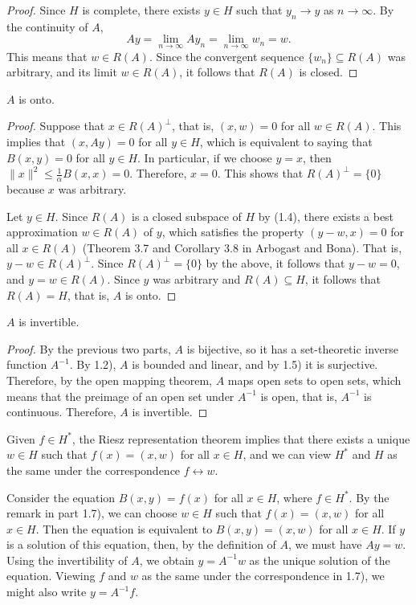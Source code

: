 \documentclass{homework}
\begin{document}
\begin{arabicparts}
\begin{proof}
			Since $H$ is complete, there exists $y \in H$ such that $y_n \to y$ as $n \to \infty$. By the continuity of $A$,
			\begin{equation}
				Ay = \lim_{n\to \infty}Ay_n = \lim_{n\to\infty} w_n = w.
			\end{equation}
			This means that $w \in R(A)$. Since the convergent sequence $\{w_n\}\subseteq R(A)$ was arbitrary, and its limit $w \in R(A)$, it follows that $R(A)$ is closed.
		\end{proof}
		
		\questionpart
		$A$ is onto.
		\begin{proof}
			Suppose that $x \in R(A)^\perp$, that is, $(x, w) = 0$ for all $w \in R(A)$. This implies that $(x, Ay) = 0$ for all $y \in H$, which is equivalent to saying that $B(x, y) = 0$ for all $y \in H$. In particular, if we choose $y = x$, then $\lVert x\rVert^2 \le \frac{1}{\alpha}B(x, x) = 0$. Therefore, $x = 0$. This shows that $R(A)^\perp = \{0\}$ because $x$ was arbitrary. 
			
			Let $y \in H$. Since $R(A)$ is a closed subspace of $H$ by (1.4), there exists a best approximation $w \in R(A)$ of $y$, which satisfies the property $(y - w, x) = 0$ for all $x \in R(A)$ (Theorem 3.7 and Corollary 3.8 in Arbogast and Bona). That is, $y-w \in R(A)^\perp$. Since $R(A)^\perp =\{0\}$ by the above, it follows that $y-w = 0$, and $y=w \in R(A)$. Since $y$ was arbitrary and $R(A) \subseteq H$, it follows that $R(A) = H$, that is, $A$  is onto.
		\end{proof}
		
		\questionpart
		$A$ is invertible.
		\begin{proof}
			By the previous two parts, $A$ is bijective, so it has a set-theoretic inverse function $A^{-1}$. By 1.2), $A$ is bounded and linear, and by 1.5) it is surjective. Therefore, by the open mapping theorem, $A$ maps open sets to open sets, which means that the preimage of an open set under $A^{-1}$ is open, that is, $A^{-1}$ is continuous. Therefore, $A$ is invertible.
		\end{proof}
		
		\questionpart
		Given $f \in H^{*}$, the Riesz representation theorem implies that there exists a unique $w \in H$ such that $f(x) = (x,w)$ for all $x \in H$, and we can view $H^{*}$ and $H$ as the same under the correspondence $f \leftrightarrow w$.
		
		\questionpart
		Consider the equation $B(x,y) = f(x)$ for all $x \in H$, where $f \in H^{*}$. By the remark in part 1.7), we can choose $w \in H$ such that $f(x) = (x,w)$ for all $x \in H$. Then the equation is equivalent to $B(x,y) = (x,w)$ for all $x \in H$. If $y$ is a solution of this equation, then, by the definition of $A$, we must have $Ay = w$. Using the invertibility of $A$, we obtain $y = A^{-1}w$ as the unique solution of the equation. Viewing $f$ and $w$ as the same under the correspondence in 1.7), we might also write $y = A^{-1}f$.
	\end{arabicparts}
	
\end{document}
